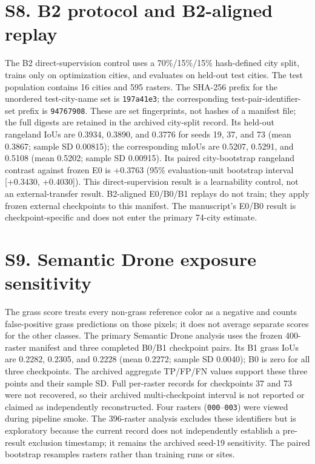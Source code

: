\section*{S8. B2 protocol and B2-aligned replay}
The B2 direct-supervision control uses a 70\%/15\%/15\% hash-defined city split, trains only on optimization cities, and evaluates on held-out test cities. The test population contains 16 cities and 595 rasters. The SHA-256 prefix for the unordered test-city-name set is \texttt{197a41e3}; the corresponding test-pair-identifier-set prefix is \texttt{94767908}. These are set fingerprints, not hashes of a manifest file; the full digests are retained in the archived city-split record. Its held-out rangeland IoUs are 0.3934, 0.3890, and 0.3776 for seeds 19, 37, and 73 (mean 0.3867; sample SD 0.00815); the corresponding mIoUs are 0.5207, 0.5291, and 0.5108 (mean 0.5202; sample SD 0.00915). Its paired city-bootstrap rangeland contrast against frozen E0 is +0.3763 (95\% evaluation-unit bootstrap interval [+0.3430, +0.4030]). This direct-supervision result is a learnability control, not an external-transfer result. B2-aligned E0/B0/B1 replays do not train; they apply frozen external checkpoints to this manifest. The manuscript's E0/B0 result is checkpoint-specific and does not enter the primary 74-city estimate.

\section*{S9. Semantic Drone exposure sensitivity}
The grass score treats every non-grass reference color as a negative and counts false-positive grass predictions on those pixels; it does not average separate scores for the other classes. The primary Semantic Drone analysis uses the frozen 400-raster manifest and three completed B0/B1 checkpoint pairs. Its B1 grass IoUs are 0.2282, 0.2305, and 0.2228 (mean 0.2272; sample SD 0.0040); B0 is zero for all three checkpoints. The archived aggregate TP/FP/FN values support these three points and their sample SD. Full per-raster records for checkpoints 37 and 73 were not recovered, so their archived multi-checkpoint interval is not reported or claimed as independently reconstructed. Four rasters (\texttt{000}--\texttt{003}) were viewed during pipeline smoke. The 396-raster analysis excludes these identifiers but is exploratory because the current record does not independently establish a pre-result exclusion timestamp; it remains the archived seed-19 sensitivity. The paired bootstrap resamples rasters rather than training runs or sites.

